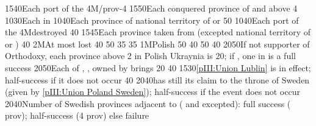 %
%
{15}{40}{Each port of the \regionBaltique}%
%
\EUobjective4M{\payscrimee/\paysmoldavie}{prov-4}%
{15}{50}{Each conquered province of  and  above
  4}%
%
%
%
{10}{30}{Each \COL in \granderegionAlaska}%
%
%
%
{10}{40}{Each province of national territory of \paysgeorgie or \paysperse}%
%
%
{}{50}{}%
%
%
{10}{40}{Each port of the \regionBaltique}%
%
\EUobjective4M{\payscrimee destroyed}{}%
{}{40}{}%
%
%
{15}{45}{Each province taken from \paysmajeurTurquie (excepted national
  territory of \paysgeorgie or \paysperse)}%
%
 
%
%
{}{40}{}%
%
\EUobjective2M{At most \provinceSmolenska lost}{}%
{}{40}{}%
%
%
{}{50}{}%
%
%
{}{35}{}%
%
%
{}{35}{}%
%
%
\EUobjective1M{Polish \provinceSmolenska}{}%
{}{50}{}%
%
%
{}{40}{}%
%
%
{}{50}{}%
%
%
{}{40}{}%
%
%
{20}{50}{If not supporter of Orthodoxy, each province above 2 in Polish
  Ukraynia is 20\VPs; if \Xorthodoxe, one \COL in \continentSiberia is a full
  success}%
%
%
%
{20}{50}{Each of \provinceKurland, \provinceMemel, \provincePreussen owned by
  \paysmajeurPologne brings 20\VPs}%
%
%
{}{40}{}%
%
%
{15}{30}{\ref{pIII:Union Lublin} is in effect; half-success if it does not
  occur}%
%
%
{}{40}{}%
%
%
{20}{40}{\POL has still its claim to the throne of Sweden (given by
  \ref{pIII:Union Poland Sweden}); half-success if the event does not occur}%
%
%
%
{20}{40}{Number of Swedish provinces adjacent to \regionBaltique (\regionSuede
  and \regionFinlande excepted): full success ( prov);
  half-success (4 prov) else failure}%
